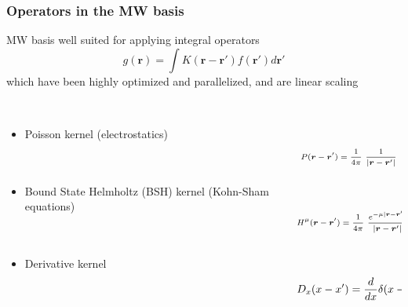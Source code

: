\documentclass[slides]{beamer}
\begin{document}
\begin{frame}
    \frametitle{Operators in the MW basis}
    MW basis well suited for applying integral operators
    \begin{equation}
	\nonumber
	g(\boldsymbol{r}) = \int K(\boldsymbol{r} - \boldsymbol{r'}) 
	    f(\boldsymbol{r'}) d\boldsymbol{r'}
    \end{equation}
    which have been highly optimized and parallelized, and are linear scaling
    \ \\
    \ \\
    \pause
    \begin{columns}
    \begin{column}{.48\textwidth}
    \begin{itemize}
	\item Poisson kernel (electrostatics)
	    \ \\
	    \ \\
	    \ \\
	\item Bound State Helmholtz (BSH) kernel (Kohn-Sham equations)
	    \ \\
	    \ \\
	    \ \\
	\item Derivative kernel
    \end{itemize}
    \end{column}
    \begin{column}{.48\textwidth}
    \ \\
    \begin{equation}
	\nonumber
	\scriptsize
	P(\boldsymbol{r}-\boldsymbol{r}') = 
	    \frac{1}{4\pi}\ \frac{1}{|\boldsymbol{r}-\boldsymbol{r}'|}
    \end{equation}
    \ \\
    \ \\
    \begin{equation}
	\nonumber
	\scriptsize
	H^{\mu}(\boldsymbol{r}-\boldsymbol{r}') = \frac{1}{4\pi}\ 
	    \frac{e^{-\mu |\boldsymbol{r}-\boldsymbol{r}'|}}{|\boldsymbol{r}-\boldsymbol{r}'|}
    \end{equation}
    \ \\
    \ \\
    \begin{equation}
	\nonumber
	\scriptsize
	D_x(x-x') = \frac{d}{dx} \delta(x - x')
    \end{equation}
    \end{column}
    \end{columns}
\end{frame}
\end{document}
